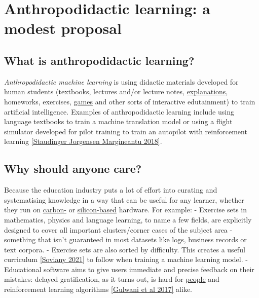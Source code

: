 \section{Anthropodidactic learning: a modest proposal}


\subsection{What is anthropodidactic
learning?}

\emph{Anthropodidactic machine learning} is using didactic materials
developed for human students (textbooks, lectures and/or lecture notes,
\href{https://github.com/vadim0x60/awesome-explanations}{explanations},
homeworks, exercises, \href{http://www.virtu-als.com/}{games} and other
sorts of interactive edutainment) to train artificial intelligence.
Examples of anthropodidactic learning include using language textbooks
to train a machine translation model or using a flight simulator
developed for pilot training to train an autopilot with reinforcement
learning \href{https://openreview.net/pdf?id=H1mMHwt9X}{{[}Staudinger
Jorgensen Margineantu 2018{]}}.


\subsection{Why should anyone care?}\label{why-should-anyone-care}

Because the education industry puts a lot of effort into curating and
systematising knowledge in a way that can be useful for any learner,
whether they run on
\href{https://en.wikipedia.org/wiki/Human_brain}{carbon-} or
\href{https://en.wikipedia.org/wiki/Central_processing_unit}{silicon-based}
hardware. For example: - Exercise sets in mathematics, physics and
language learning, to name a few fields, are explicitly designed to
cover all important clusters/corner cases of the subject area -
something that isn't guaranteed in most datasets like logs, business
records or text corpora. - Exercise sets are also sorted by difficulty.
This creates a useful curriculum
\href{https://arxiv.org/abs/2101.10382}{{[}Soviany 2021{]}} to follow
when training a machine learning model. - Educational software aims to
give users immediate and precise feedback on their mistakes: delayed
gratification, as it turns out, is hard for
\href{https://en.wikipedia.org/wiki/Stanford_marshmallow_experiment}{people}
and reinforcement learning algorithms
\href{https://www.nowpublishers.com/article/Details/PGL-010}{{[}Gulwani
et al 2017{]}} alike.

